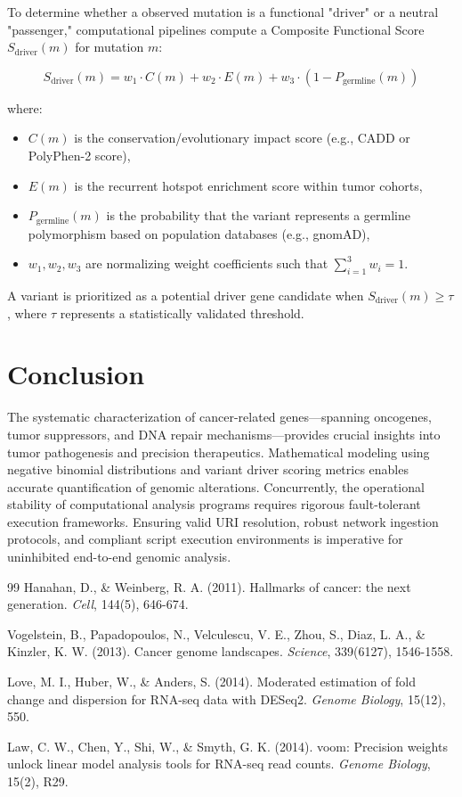 \documentclass{article}
\begin{document}
To determine whether a observed mutation is a functional "driver" or a neutral "passenger," computational pipelines compute a Composite Functional Score $S_{\text{driver}}(m)$ for mutation $m$:

\begin{equation}
S_{\text{driver}}(m) = w_1 \cdot C(m) + w_2 \cdot E(m) + w_3 \cdot \left(1 - P_{\text{germline}}(m)\right)
\end{equation}

where:
\begin{itemize}
    \item $C(m)$ is the conservation/evolutionary impact score (e.g., CADD or PolyPhen-2 score),
    \item $E(m)$ is the recurrent hotspot enrichment score within tumor cohorts,
    \item $P_{\text{germline}}(m)$ is the probability that the variant represents a germline polymorphism based on population databases (e.g., gnomAD),
    \item $w_1, w_2, w_3$ are normalizing weight coefficients such that $\sum_{i=1}^{3} w_i = 1$.
\end{itemize}

A variant is prioritized as a potential driver gene candidate when $S_{\text{driver}}(m) \ge \tau$, where $\tau$ represents a statistically validated threshold.

\section{Conclusion}

The systematic characterization of cancer-related genes—spanning oncogenes, tumor suppressors, and DNA repair mechanisms—provides crucial insights into tumor pathogenesis and precision therapeutics. Mathematical modeling using negative binomial distributions and variant driver scoring metrics enables accurate quantification of genomic alterations. Concurrently, the operational stability of computational analysis programs requires rigorous fault-tolerant execution frameworks. Ensuring valid URI resolution, robust network ingestion protocols, and compliant script execution environments is imperative for uninhibited end-to-end genomic analysis.

\begin{thebibliography}{99}
Hanahan, D., \& Weinberg, R. A. (2011). Hallmarks of cancer: the next generation. \textit{Cell}, 144(5), 646-674.

Vogelstein, B., Papadopoulos, N., Velculescu, V. E., Zhou, S., Diaz, L. A., \& Kinzler, K. W. (2013). Cancer genome landscapes. \textit{Science}, 339(6127), 1546-1558.

Love, M. I., Huber, W., \& Anders, S. (2014). Moderated estimation of fold change and dispersion for RNA-seq data with DESeq2. \textit{Genome Biology}, 15(12), 550.

Law, C. W., Chen, Y., Shi, W., \& Smyth, G. K. (2014). voom: Precision weights unlock linear model analysis tools for RNA-seq read counts. \textit{Genome Biology}, 15(2), R29.
\end{thebibliography}
\end{document}
